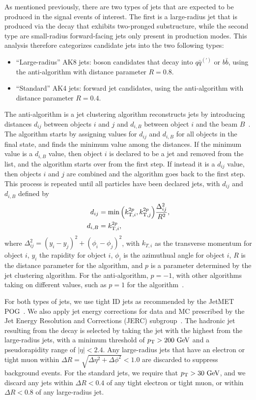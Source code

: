 As mentioned previously, there are two types of jets that are expected to be produced in the signal events of interest.
The first is a large-radius jet that is produced via the \VorH decay that exhibits two-pronged substructure, while the second type are small-radius forward-facing jets only present in \VBF production modes.
This analysis therefore categorizes candidate jets into the two following types:
\begin{itemize}
  \item ``Large-radius'' AK8 jets: \VorH boson candidates that decay into $q\bar{q}^{(\prime)}$ or $b\bar{b}$, using the anti-\kt algorithm with distance parameter $R=0.8$.
  \item ``Standard'' AK4 jets: \VBF forward jet candidates, using the anti-\kt algorithm with distance parameter $R=0.4$.
\end{itemize}

The anti-\kt algorithm is a jet clustering algorithm reconstructs jets by introducing distances $d_{ij}$ between objects $i$ and $j$ and $d_{i,B}$ between object $i$ and the beam $B$~\cite{Cacciari_2008}.
The algorithm starts by assigning values for $d_{ij}$ and $d_{i,B}$ for all objects in the final state, and finds the minimum value among the distances.
If the minimum value is a $d_{i,B}$ value, then object $i$ is declared to be a jet and removed from the list, and the algorithm starts over from the first step.
If instead it is a $d_{ij}$ value, then objects $i$ and $j$ are combined and the algorithm goes back to the first step.
This process is repeated until all particles have been declared jets, with $d_{ij}$ and $d_{i,B}$ defined by
\begin{align}
  d_{ij} &= \min\pqty{k_{\mathrm{T},i}^{2p},k_{\mathrm{T},j}^{2p}}\frac{\Delta_{ij}^2}{R^2},\\
  d_{i,B} &= k_{\mathrm{T},i}^{2p},
\end{align}
where $\Delta_{ij}^2=(y_i-y_j)^2+(\phi_i-\phi_j)^2$, with $k_{T,i}$ as the transverse momentum for object $i$, $y_i$ the rapidity for object $i$, $\phi_i$ is the azimuthual angle for object $i$, $R$ is the distance parameter for the algorithm, and $p$ is a parameter determined by the jet clustering algorithm.
For the anti-\kt algorithm, $p=-1$, with other algorithms taking on different values, such as $p=1$ for the \kt algorithm~\cite{Marzani_2019}.

For both types of jets, we use tight ID jets as recommended by the JetMET POG~\cite{jetID2016,jetID2017,jetID2018}.
We also apply jet energy corrections for data and MC prescribed by the Jet Energy Resolution and Corrections (JERC) subgroup~\cite{JetEnergyScale}.
The hadronic jet resulting from the \VorH decay is selected by taking the jet with the highest \pt from the large-radius jets, with a minimum threshold of $\pt>200\unit{GeV}$ and a pseudorapidity range of $|\eta|<2.4$.
Any large-radius jets that have an electron or tight muon within $\Delta R=\sqrt{\Delta\eta^2+\Delta\phi^2}<1.0$ are discarded to suppress background events.
For the standard jets, we require that $\pt>30\unit{GeV}$, and we discard any jets within $\Delta R<0.4$ of any tight electron or tight muon, or within $\Delta R<0.8$ of any large-radius jet.

